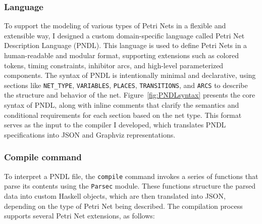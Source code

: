 \documentclass[12pt]{article}
\begin{document}
        \subsubsection{Language}
            To support the modeling of various types of Petri Nets in a flexible and extensible way, I designed a custom domain-specific language called Petri Net Description Language (PNDL). This language is used to define Petri Nets in a human-readable and modular format, supporting extensions such as colored tokens, timing constraints, inhibitor arcs, and high-level parameterized components. The syntax of PNDL is intentionally minimal and declarative, using sections like \texttt{NET\_TYPE}, \texttt{VARIABLES}, \texttt{PLACES}, \texttt{TRANSITIONS}, and \texttt{ARCS} to describe the structure and behavior of the net. 
            Figure~\ref{fig:PNDLsyntax} presents the core syntax of PNDL, along with inline comments that clarify the semantics and conditional requirements for each section based on the net type. This format serves as the input to the compiler I developed, which translates PNDL specifications into JSON and Graphviz representations.      
        \subsubsection{Compile command}
        To interpret a PNDL file, the \texttt{compile} command invokes a series of functions that parse its contents using the \texttt{Parsec} module. These functions structure the parsed data into custom Haskell objects, which are then translated into JSON, depending on the type of Petri Net being described. The compilation process supports several Petri Net extensions, as follows:
\end{document}
